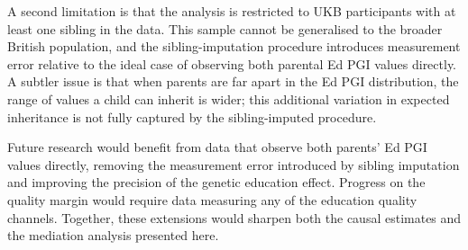 A second limitation is that the analysis is restricted to UKB participants with at least one sibling in the data.
This sample cannot be generalised to the broader British population, and the sibling-imputation procedure introduces measurement error relative to the ideal case of observing both parental Ed PGI values directly.
A subtler issue is that when parents are far apart in the Ed PGI distribution, the range of values a child can inherit is wider; this additional variation in expected inheritance is not fully captured by the sibling-imputed procedure.

Future research would benefit from data that observe both parents' Ed PGI values directly, removing the measurement error introduced by sibling imputation and improving the precision of the genetic education effect.
Progress on the quality margin would require data measuring any of the education quality channels.
Together, these extensions would sharpen both the causal estimates and the mediation analysis presented here.
